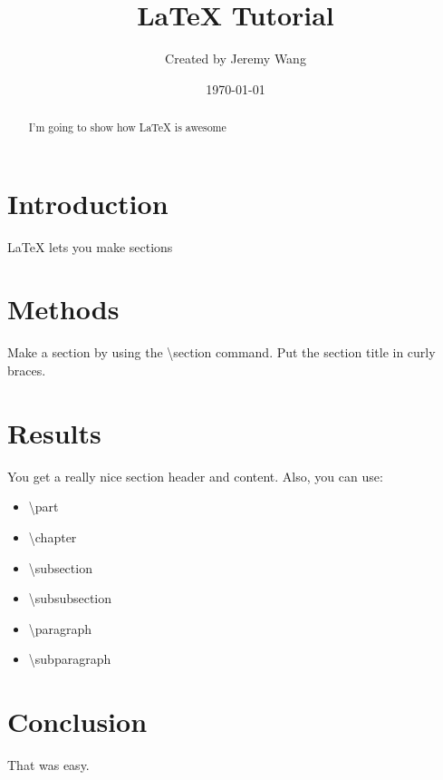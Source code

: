 \documentclass[12pt]{article}
\title{\LaTeX{} Tutorial}
\author{Created by Jeremy Wang}
\date{\today}
\begin{document}
  \maketitle

  \begin{abstract}
    I'm going to show how \LaTeX{} is awesome
  \end{abstract}

  \section{Introduction}
    \LaTeX{} lets you make sections
  
  \section{Methods}
    Make a section by using the \textbackslash{}section command. Put the section title in curly braces.

  \section{Results}
    You get a really nice section header and content.
    Also, you can use:
    \begin{itemize}
      \item \textbackslash{}part
      \item \textbackslash{}chapter
      \item \textbackslash{}subsection
      \item \textbackslash{}subsubsection
      \item \textbackslash{}paragraph
      \item \textbackslash{}subparagraph
    \end{itemize}

  \section{Conclusion}
    That was easy.
\end{document}
